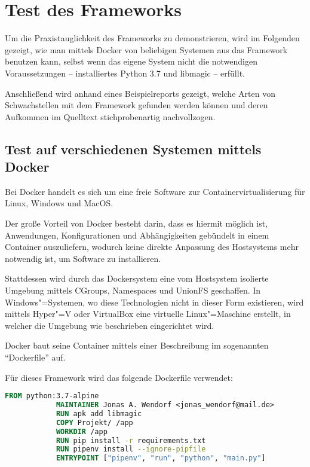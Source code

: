\chapter{Test des Frameworks}
    Um die Praxistauglichkeit des Frameworks zu demonstrieren,
    wird im Folgenden gezeigt,
    wie man mittels Docker von beliebigen Systemen aus das Framework benutzen kann,
    selbst wenn das eigene System nicht die notwendigen Voraussetzungen
    -- installiertes Python 3.7 und
    libmagic
    -- erfüllt.

    Anschließend wird anhand eines Beispielreports gezeigt,
    welche Arten von Schwachstellen mit dem Framework gefunden werden können und
    deren Aufkommen im Quelltext stichprobenartig nachvollzogen.

    \section{Test auf verschiedenen Systemen mittels Docker}
        Bei Docker handelt es sich um eine freie Software zur Containervirtualisierung für Linux,
        Windows und
        MacOS.\cite{Docker2019}

        Der große Vorteil von Docker besteht darin,
        dass es hiermit möglich ist,
        Anwendungen,
        Konfigurationen und
        Abhängigkeiten gebündelt in einem Container auszuliefern,
        wodurch keine direkte Anpassung des Hostsystems mehr notwendig ist,
        um Software zu installieren.

        Stattdessen wird durch das Dockersystem eine vom Hostsystem isolierte Umgebung mittels
        \gls{CGroups},
        Namespaces und
        \gls{UnionFS} geschaffen.
        In Windows"=Systemen,
        wo diese Technologien nicht in dieser Form existieren,
        wird mittels Hyper"=V oder
        VirtualBox eine virtuelle Linux"=Maschine erstellt,
        in welcher die Umgebung wie beschrieben eingerichtet wird.\cite{Docker2019a}

        Docker baut seine Container mittels einer Beschreibung im sogenannten
        \foreignquote{english}{Dockerfile} auf.

        Für dieses Framework wird das folgende Dockerfile verwendet:

        \begin{lstlisting}[caption={Dockerfile für das entwickelte Framework}, language=Dockerfile, gobble=12]
            FROM python:3.7-alpine
            MAINTAINER Jonas A. Wendorf <jonas_wendorf@mail.de>
            RUN apk add libmagic
            COPY Projekt/ /app
            WORKDIR /app
            RUN pip install -r requirements.txt
            RUN pipenv install --ignore-pipfile
            ENTRYPOINT ["pipenv", "run", "python", "main.py"]
        \end{lstlisting}

